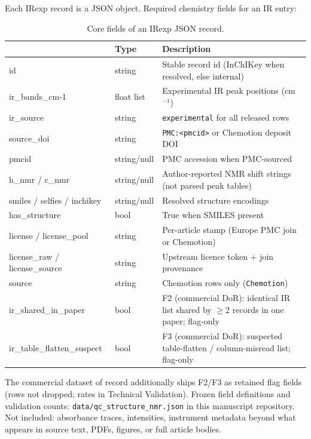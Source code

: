 \documentclass[pdflatex,sn-nature]{sn-jnl}
\begin{document}
Each IRexp record is a JSON object.
Required chemistry fields for an IR entry:

\begin{table}[ht]
\caption{Core fields of an IRexp JSON record.}\label{tab:fields}
\scriptsize
\begin{tabular}{@{}>{\ttfamily\raggedright\arraybackslash}p{3.35cm}
  >{\raggedright\arraybackslash}p{1.55cm}
  >{\raggedright\arraybackslash}p{6.15cm}@{}}
\toprule
\multicolumn{1}{l}{Field} & Type & Description \\
\midrule
id & string & Stable record id (InChIKey when resolved, else internal) \\
ir\_bands\_cm-1 & float list & Experimental IR peak positions (cm$^{-1}$) \\
ir\_source & string & \texttt{experimental} for all released rows \\
source\_doi & string & \texttt{PMC:<pmcid>} or Chemotion deposit DOI \\
pmcid & string/null & PMC accession when PMC-sourced \\
h\_nmr / c\_nmr & string/null & Author-reported NMR shift strings (not parsed peak tables) \\
smiles / selfies / inchikey & string/null & Resolved structure encodings \\
has\_structure & bool & True when SMILES present \\
license / license\_pool & string & Per-article stamp (Europe PMC join or Chemotion) \\
license\_raw / license\_source & string & Upstream licence token + join provenance \\
source & string & Chemotion rows only (\texttt{Chemotion}) \\
ir\_shared\_in\_paper & bool & F2 (commercial DoR): identical IR list shared by $\geq$2 records in one paper; flag-only \\
ir\_table\_flatten\_suspect & bool & F3 (commercial DoR): suspected table-flatten / column-misread list; flag-only \\
\bottomrule
\end{tabular}
\end{table}

The commercial dataset of record additionally ships F2/F3 as retained flag
fields (rows not dropped; rates in Technical Validation).
Frozen field definitions and validation counts:
\texttt{data/qc\_structure\_nmr.json} in this manuscript repository.
Not included: absorbance traces, intensities, instrument metadata beyond what
appears in source text, PDFs, figures, or full article bodies.
\end{document}
